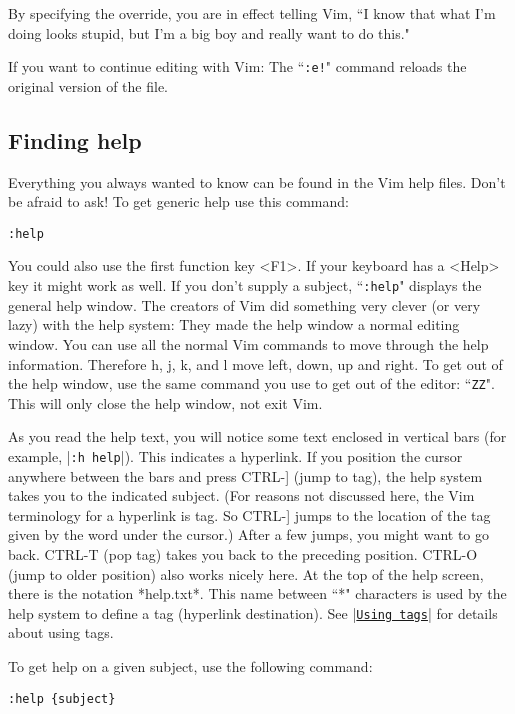 By specifying the override, you are in effect telling Vim, ``I know that what I'm doing looks stupid, but I'm a big boy and really want to do this."

If you want to continue editing with Vim: The ``\texttt{:e!}" command reloads the original version of the file.

\subsection{Finding help}

Everything you always wanted to know can be found in the Vim help files.
Don't be afraid to ask!
To get generic help use this command:

 \begin{Verbatim}[samepage=true]
 :help
 \end{Verbatim}

You could also use the first function key <F1>.
If your keyboard has a <Help> key it might work as well.
If you don't supply a subject, ``\texttt{:help}" displays the general help window.
The creators of Vim did something very clever (or very lazy) with the help system: They made the help window a normal editing window.
You can use all the normal Vim commands to move through the help information.
Therefore h, j, k, and l move left, down, up and right.
To get out of the help window, use the same command you use to get out of the editor: ``\texttt{ZZ}".
This will only close the help window, not exit Vim.

As you read the help text, you will notice some text enclosed in vertical bars (for example, |\texttt{:h help}|).
This indicates a hyperlink.
If you position the cursor anywhere between the bars and press CTRL-] (jump to tag), the help system takes you to the indicated subject.
(For reasons not discussed here, the Vim terminology for a hyperlink is tag.
So CTRL-] jumps to the location of the tag given by the word under the cursor.) After a few jumps, you might want to go back.
CTRL-T (pop tag) takes you back to the preceding position.
CTRL-O (jump to older position) also works nicely here.
At the top of the help screen, there is the notation *help.txt*.
This name between ``*" characters is used by the help system to define a tag (hyperlink destination).
See |\hyperref[Using tags]{\texttt{Using tags}}| for details about using tags.

To get help on a given subject, use the following command:

 \begin{Verbatim}[samepage=true]
 :help {subject}
 \end{Verbatim}

